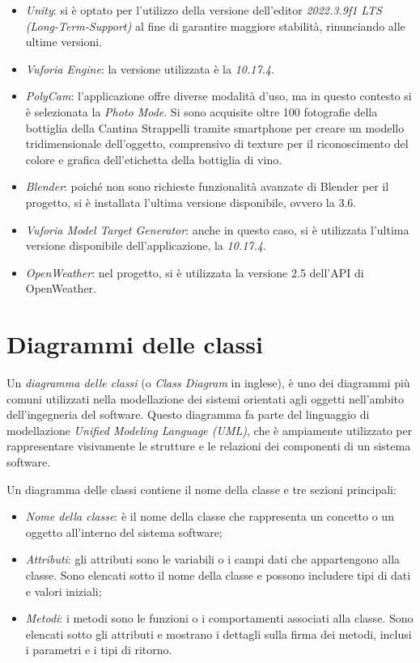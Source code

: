 \begin{itemize}
\item \textit{Unity}: si è optato per l'utilizzo della versione dell'editor \textit{2022.3.9f1 LTS (Long-Term-Support)} al fine di garantire maggiore stabilità, rinunciando alle ultime versioni.
\item \textit{Vuforia Engine}: la versione utilizzata è la \textit{10.17.4}.
\item \textit{PolyCam}: l'applicazione offre diverse modalità d'uso, ma in questo contesto si è selezionata la \textit{Photo Mode}. Si sono acquisite oltre 100 fotografie della bottiglia della Cantina Strappelli tramite smartphone per creare un modello tridimensionale dell'oggetto, comprensivo di texture per il riconoscimento del colore e grafica dell'etichetta della bottiglia di vino.
\item \textit{Blender}: poiché non sono richieste funzionalità avanzate di Blender per il progetto, si è installata l'ultima versione disponibile, ovvero la 3.6.
\item \textit{Vuforia Model Target Generator}: anche in questo caso, si è utilizzata l'ultima versione disponibile dell'applicazione, la \textit{10.17.4}.
\item \textit{OpenWeather}: nel progetto, si è utilizzata la versione 2.5 dell'API di OpenWeather.
\end{itemize}

\section{Diagrammi delle classi}

Un \textit{diagramma delle classi} (o \textit{Class Diagram} in inglese), è uno dei diagrammi più comuni utilizzati nella modellazione dei sistemi orientati agli oggetti nell'ambito dell'ingegneria del software. Questo diagramma fa parte del linguaggio di modellazione \textit{Unified Modeling Language (UML)}, che è ampiamente utilizzato per rappresentare visivamente le strutture e le relazioni dei componenti di un sistema software.

Un diagramma delle classi contiene il nome della classe e tre sezioni principali:

\begin{itemize}
    \item \textit{Nome della classe}: è il nome della classe che rappresenta un concetto o un oggetto all'interno del sistema software;
    \item \textit{Attributi}: gli attributi sono le variabili o i campi dati che appartengono alla classe. Sono elencati sotto il nome della classe e possono includere tipi di dati e valori iniziali;
    \item \textit{Metodi}: i metodi sono le funzioni o i comportamenti associati alla classe. Sono elencati sotto gli attributi e mostrano i dettagli sulla firma dei metodi, inclusi i parametri e i tipi di ritorno.
\end{itemize}

